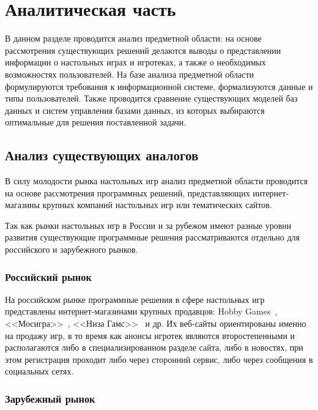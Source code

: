 \chapter{Аналитическая часть}

\begin{comment}
\end{comment}

В данном разделе проводится анализ предметной области: на основе рассмотрения
существующих решений делаются выводы о представлении информации о настольных
играх и игротеках, а также о необходимых возможностях пользователей. На базе
анализа предметной области формулируются требования к информационной системе,
формализуются данные и типы пользователей. Также проводится сравнение
существующих моделей баз данных и систем управления базами данных, из которых
выбираются оптимальные для решения поставленной задачи.

\section{Анализ существующих аналогов}

В силу молодости рынка настольных игр анализ предметной области проводится на
основе рассмотрения программных решений, представляющих интернет-магазины
крупных компаний настольных игр или тематических сайтов.

Так как рынки настольных игр в России и за рубежом имеют разные уровни развития
существующие программные решения рассматриваются отдельно для российского и
зарубежного рынков.

\subsection{Российский рынок}

На российском рынке программные решения в сфере настольных игр представлены
интернет-магазинами крупных продавцов: Hobby Games~\cite{site01},
<<Мосигра>>~\cite{site02}, <<Низа Гамс>>~\cite{site03} и др. Их веб-сайты
ориентированы именно на продажу игр, в то время как анонсы игротек являются
второстепенными и располагаются либо в специализированном разделе сайта, либо в
новостях, при этом регистрация проходит либо через сторонний сервис, либо через
сообщения в социальных сетях.

\subsection{Зарубежный рынок}

